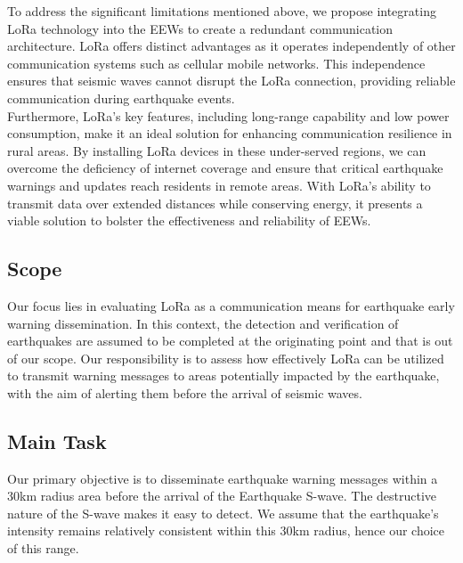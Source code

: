 To address the significant limitations mentioned above, we propose integrating LoRa technology into the \ac{EEWs} to create a redundant communication architecture. LoRa offers distinct advantages as it operates independently of other communication systems such as cellular mobile networks. This independence ensures that seismic waves cannot disrupt the LoRa connection, providing reliable communication during earthquake events.\\

Furthermore, LoRa's key features, including long-range capability and low power consumption, make it an ideal solution for enhancing communication resilience in rural areas. By installing LoRa devices in these under-served regions, we can overcome the deficiency of internet coverage and ensure that critical earthquake warnings and updates reach residents in remote areas. With LoRa's ability to transmit data over extended distances while conserving energy, it presents a viable solution to bolster the effectiveness and reliability of \ac{EEWs}.

\subsection{Scope}
\hspace{12pt}Our focus lies in evaluating LoRa as a communication means for earthquake early warning dissemination. In this context, the detection and verification of earthquakes are assumed to be completed at the originating point and that is out of our scope. Our responsibility is to assess how effectively LoRa can be utilized to transmit warning messages to areas potentially impacted by the earthquake, with the aim of alerting them before the arrival of seismic waves.


\subsection{Main Task}

\hspace{12pt} Our primary objective is to disseminate earthquake warning messages within a 30km radius area before the arrival of the Earthquake S-wave. The destructive nature of the S-wave makes it easy to detect. We assume that the earthquake's intensity remains relatively consistent within this 30km radius, hence our choice of this range.


